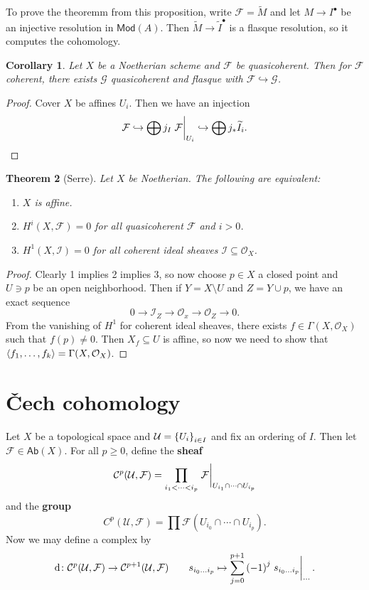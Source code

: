 \documentclass[leqno, openany]{memoir}
\newtheorem{thm}{Theorem}[section]
\newtheorem{cor}[thm]{Corollary}
\theoremstyle{definition}
\theoremstyle{remark}
\theoremstyle{plain}
\theoremstyle{definition}
\theoremstyle{remark}
\newcommand{\mc}[1]{\mathcal{#1}}
\newcommand{\ms}[1]{\mathsf{#1}}
\newcommand{\wt}[1]{\widetilde{#1}}
\begin{document}
To prove the theoremm from this proposition, write $\mc{F} = \wt{M}$ and let $M \to I^{\bullet}$ be an injective resolution in $\ms{Mod}(A)$. Then $\wt{M} \to \wt{I}^{\bullet}$ is a flasque resolution, so it computes the cohomology.

\begin{cor}
    Let $X$ be a Noetherian scheme and $\mc{F}$ be quasicoherent. Then for $\mc{F}$ coherent, there exists $\mc{G}$ quasicoherent and flasque with $\mc{F} \hookrightarrow \mc{G}$.
\end{cor}

\begin{proof}
    Cover $X$ be affines $U_i$. Then we have an injection
    \[ \mc{F} \hookrightarrow \bigoplus j_I \eval{\mc{F}}_{U_i} \hookrightarrow \bigoplus j_* \wt{I}_i. \qedhere \]
\end{proof}

\begin{thm}[Serre]
    Let $X$ be Noetherian. The following are equivalent:
    \begin{enumerate}
        \item $X$ is affine.
        \item $H^i(X, \mc{F}) = 0$ for all quasicoherent $\mc{F}$ and $i>0$.
        \item $H^1(X, \mc{I}) = 0$ for all coherent ideal sheaves $\mc{I} \subseteq \mc{O}_X$.
    \end{enumerate}
\end{thm}

\begin{proof}
    Clearly 1 implies 2 implies 3, so now choose $p \in X$ a closed point and $U \ni p$ be an open neighborhood. Then if $Y = X \setminus U$ and $Z = Y \cup p$, we have an exact sequence
    \[ 0 \to \mc{I}_Z \to \mc{O}_x \to \mc{O}_Z \to 0. \]
    From the vanishing of $H^1$ for coherent ideal sheaves, there exists $f \in \Gamma(X, \mc{O}_X)$ such that $f(p) \neq 0$. Then $X_f \subseteq U$ is affine, so now we need to show that $\ev{f_1, \ldots, f_k} = \Gamma(X, \mc{O}_X)$.
\end{proof}

\section{\v{C}ech cohomology}%
\label{sec:cech_cohomology}

Let $X$ be a topological space and $\mc{U} = \qty{U_i}_{i \in I}$ and fix an ordering of $I$. Then let $\mc{F} \in \ms{Ab}(X)$. For all $p \geq 0$, define the \textbf{sheaf} 
\[ \mc{C}^p(\mc{U}, \mc{F}) =  \prod_{i_1 < \cdots < i_p} \eval{\mc{F}}_{U_{i_1} \cap \cdots \cap U_{i_p}} \]
and the \textbf{group}
\[ C^p(\mc{U}, \mc{F}) = \prod \mc{F}(U_{i_0} \cap \cdots \cap U_{i_p}). \]
Now we may define a complex by
\[ \dd \colon \mc{C}^p(\mc{U}, \mc{F}) \to \mc{C}^{p+1}(\mc{U}, \mc{F}) \qquad {s_{i_0\ldots i_p}} \mapsto \sum_{j=0}^{p+1} {(-1)}^j \eval{ s_{i_0 \ldots i_p} }_{\cdots}. \]
\end{document}
